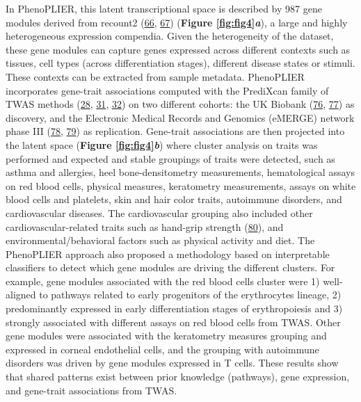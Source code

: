 In PhenoPLIER, this latent transcriptional space is described by 987 gene modules derived from recount2 (\protect\hyperlink{ref-14rnBunuZ}{66}, \protect\hyperlink{ref-6SPTvFXq}{67}) (\textbf{Figure \ref{fig:fig4}\emph{a}}), a large and highly heterogeneous expression compendia.
Given the heterogeneity of the dataset, these gene modules can capture genes expressed across different contexts such as tissues, cell types (across differentiation stages), different disease states or stimuli.
These contexts can be extracted from sample metadata.
PhenoPLIER incorporates gene-trait associations computed with the PrediXcan family of TWAS methods (\protect\hyperlink{ref-Z8bvDdVq}{28}, \protect\hyperlink{ref-vLyTudUB}{31}, \protect\hyperlink{ref-1FFzCXo1s}{32}) on two different cohorts: the UK Biobank (\protect\hyperlink{ref-nmJxPpE5}{76}, \protect\hyperlink{ref-lY5ln3dB}{77}) as discovery, and the Electronic Medical Records and Genomics (eMERGE) network phase III (\protect\hyperlink{ref-wfqjCerX}{78}, \protect\hyperlink{ref-gZAOkumx}{79}) as replication.
Gene-trait associations are then projected into the latent space (\textbf{Figure \ref{fig:fig4}\emph{b}}) where cluster analysis on traits was performed and expected and stable groupings of traits were detected, such as asthma and allergies, heel bone-densitometry measurements, hematological assays on red blood cells, physical measures, keratometry measurements, assays on white blood cells and platelets, skin and hair color traits, autoimmune disorders, and cardiovascular diseases.
The cardiovascular grouping also included other cardiovascular-related traits such as hand-grip strength (\protect\hyperlink{ref-WIZh9VF9}{80}), and environmental/behavioral factors such as physical activity and diet.
The PhenoPLIER approach also proposed a methodology based on interpretable classifiers to detect which gene modules are driving the different clusters.
For example, gene modules associated with the red blood cells cluster were 1) well-aligned to pathways related to early progenitors of the erythrocytes lineage, 2) predominantly expressed in early differentiation stages of erythropoiesis and 3) strongly associated with different assays on red blood cells from TWAS.
Other gene modules were associated with the keratometry measures grouping and expressed in corneal endothelial cells, and the grouping with autoimmune disorders was driven by gene modules expressed in T cells.
These results show that shared patterns exist between prior knowledge (pathways), gene expression, and gene-trait associations from TWAS.


